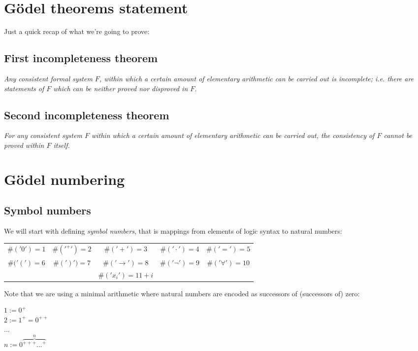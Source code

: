 \documentclass{article}
\begin{document}
\section{Gödel theorems statement}

Just a quick recap of what we're going to prove:

\subsection{First incompleteness theorem}

\textit{Any consistent formal system $F$, within which a certain amount of elementary
arithmetic can be carried out is incomplete; i.e. there are statements of $F$ which can be
neither proved nor disproved in $F$.}

\subsection{Second incompleteness theorem}
\textit{For any consistent system $F$ within which a certain amount of elementary
arithmetic can be carried out, the consistency of $F$ cannot be proved within $F$ itself.}

\section{Gödel numbering}

\subsection{Symbol numbers}

We will start with defining \textit{symbol numbers}, that is mappings from elements of
logic syntax to natural numbers:

\begin{center}
{\renewcommand{\arraystretch}{1.5}
\begin{tabular}{ c c c c c }
 $\#('0') = 1$ & $\#('^{+}') = 2$ & $\#('+') = 3$ & $\#('\cdot') = 4$ & $\#('=') = 5$ \\ 
 $\#('(') = 6$ & $\#(')') = 7$ & $\#('\rightarrow') = 8$ & $\#('\neg') = 9$ & $\#('\forall') = 10$ \\ 
 & & $\#('x_i') = 11 + i$ & & \\ 
\end{tabular}
}
\end{center}

Note that we are using a minimal arithmetic where natural numbers are encoded as successors of
(successors of) zero:
\begin{center}
    $1 := 0^+$\\
    $2 := 1^+ = 0^{++}$\\
    ...\\
    $n := 0{\overbrace{{}^{+++}...^{+}}^{n}}$
\end{center}
\end{document}
